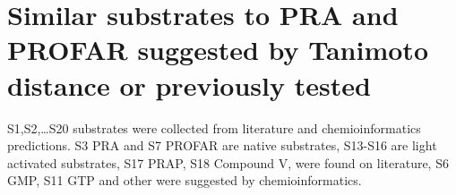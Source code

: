 \documentclass[12pt,twoside]{reedthesis}
\begin{document}
  \clearpage  
  
  \section{Similar substrates to PRA and PROFAR suggested by Tanimoto
  distance or previously
  tested}\label{similar-substrates-to-pra-and-profar-suggested-by-tanimoto-distance-or-previously-tested}
  
  S1,S2,\ldots{}S20 substrates were collected from literature and
  chemioinformatics predictions. S3 PRA and S7 PROFAR are native
  substrates, S13-S16 are light activated substrates, S17 PRAP, S18
  Compound V, were found on literature, S6 GMP, S11 GTP and other were
  suggested by chemioinformatics.
  
  \begin{Shaded}
  \begin{Highlighting}[]
  \StringTok{ }\NormalTok{(}\NormalTok{, } \NormalTok{,}\NormalTok{)}
   \CharTok{\textbackslash{}\textbackslash{}}\NormalTok{,} \NormalTok{)}
  \end{Highlighting}
  \end{Shaded}
  
\end{document}
